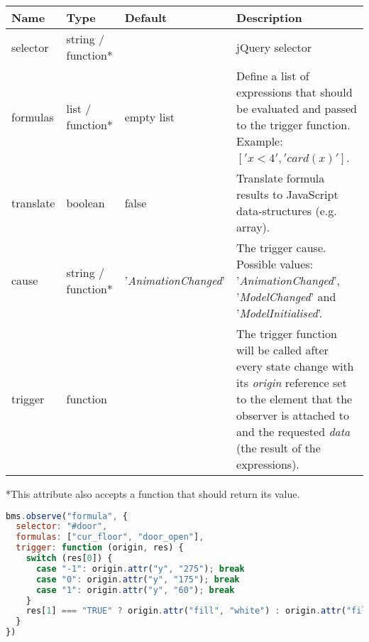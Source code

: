 \begin{tabular}{ l l l p{7cm} }
  \textbf{Name} & \textbf{Type} & \textbf{Default} & \textbf{Description} \\
  \hline\noalign{\medskip}
  selector & string / function* & & jQuery selector \\
  \hline\noalign{\medskip}
  formulas & list / function* & empty list & Define a list of expressions that should be evaluated and passed to the trigger function. Example: $['x < 4', 'card(x)']$.\\
  \hline\noalign{\medskip}
  translate & boolean & false & Translate formula results to JavaScript data-structures (e.g. array). \\
  \hline\noalign{\medskip}
  cause & string / function* & '\textit{AnimationChanged}' & The trigger cause. Possible values: '\textit{AnimationChanged}', '\textit{ModelChanged}' and '\textit{ModelInitialised}'. \\
  \hline\noalign{\medskip}
  trigger & function &  & The trigger function will be called after every state change with its \textit{origin} reference set to the element that the observer is attached to and the requested \textit{data} (the result of the expressions). \\
\end{tabular}

*This attribute also accepts a function that should return its value.

\begin{lstlisting}[language=JavaScript]
bms.observe("formula", {
  selector: "#door",
  formulas: ["cur_floor", "door_open"],
  trigger: function (origin, res) {
    switch (res[0]) {
      case "-1": origin.attr("y", "275"); break
      case "0": origin.attr("y", "175"); break
      case "1": origin.attr("y", "60"); break
    }
    res[1] === "TRUE" ? origin.attr("fill", "white") : origin.attr("fill", "lightgray")
  }
})
\end{lstlisting}


